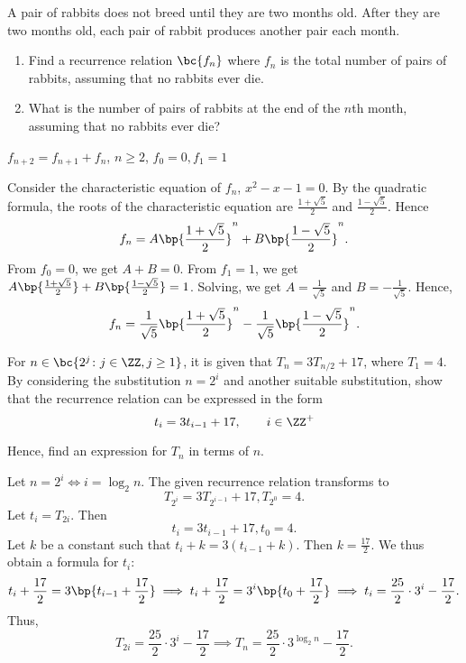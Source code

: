 \clearpage
\begin{problem}
    A pair of rabbits does not breed until they are two months old. After they are two months old, each pair of rabbit produces another pair each month.

    \begin{enumerate}
        \item Find a recurrence relation $\bc{f_n}$ where $f_n$ is the total number of pairs of rabbits, assuming that no rabbits ever die.
        \item What is the number of pairs of rabbits at the end of the $n$th month, assuming that no rabbits ever die?
    \end{enumerate}
\end{problem}
\begin{solution}
    \begin{ppart}
        $f_{n+2} = f_{n+1} + f_n$, $n \geq 2$, $f_0 = 0, f_1 = 1$
    \end{ppart}
    \begin{ppart}
        Consider the characteristic equation of $f_n$, $x^2 - x - 1 = 0$. By the quadratic formula, the roots of the characteristic equation are $\frac{1 + \sqrt5}{2}$ and $\frac{1 - \sqrt5}{2}$. Hence \[f_n = A \bp{\frac{1 + \sqrt5}{2}}^n + B \bp{\frac{1 - \sqrt5}{2}}^n.\] From $f_0 = 0$, we get $A + B = 0$. From $f_1 = 1$, we get $A \bp{\frac{1 + \sqrt5}2} + B \bp{\frac{1 - \sqrt5}2} = 1$. Solving, we get $A = \frac1{\sqrt5}$ and $B = -\frac1{\sqrt5}$. Hence, \[f_n = \frac1{\sqrt5} \bp{\frac{1 + \sqrt5}{2}}^n - \frac1{\sqrt5} \bp{\frac{1 - \sqrt5}{2}}^n.\]
    \end{ppart}
\end{solution}

\begin{problem}
    For $n \in \bc{2^j \colon j \in \ZZ, j \geq 1}$, it is given that $T_n = 3T_{n/2} + 17$, where $T_1 = 4$. By considering the substitution $n = 2^i$ and another suitable substitution, show that the recurrence relation can be expressed in the form
    \[
        t_i = 3t_{i-1} + 17, \qquad i \in \ZZ^+
    \]
    
    Hence, find an expression for $T_n$ in terms of $n$.
\end{problem}
\begin{solution}
        Let $n = 2^i \iff i = \log_2{n}$. The given recurrence relation transforms to \[T_{2^i} = 3T_{2^{i-1}} + 17, T_{2^0} = 4.\] Let $t_i = T_{2i}$. Then \[t_i = 3t_{i-1} + 17, t_0 = 4.\] Let $k$ be a constant such that $t_i + k = 3(t_{i-1} + k)$. Then $k = \frac{17}2$. We thus obtain a formula for $t_i$: \[t_i + \frac{17}2 = 3\bp{t_{i-1} + \frac{17}2} \implies t_i + \frac{17}{2} = 3^i \bp{t_0 + \frac{17}{2}} \implies t_i = \frac{25}{2} \cdot 3^i - \frac{17}{2}.\] Thus, \[T_{2i} = \frac{25}{2} \cdot 3^i - \frac{17}{2} \implies T_n = \frac{25}{2} \cdot 3^{\log_2 n} - \frac{17}2.\]
\end{solution}

